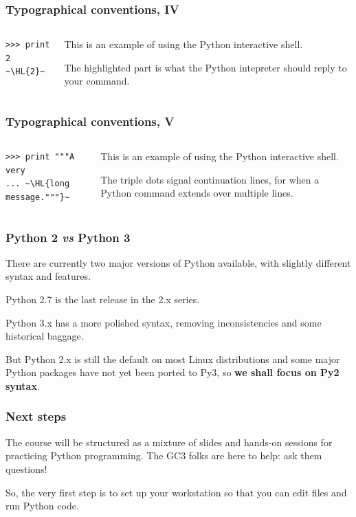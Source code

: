 \documentclass[english,serif,mathserif,xcolor=pdftex,dvipsnames,table]{beamer}
\begin{document}
\begin{frame}[fragile]
  \frametitle{Typographical conventions, IV}

    \begin{columns}[t]
    \begin{column}{0.5\textwidth}
\begin{lstlisting}
>>> print 2
~\HL{2}~
\end{lstlisting}
    \end{column}
    \begin{column}{0.5\textwidth}
      \raggedleft
      This is an example of using the Python interactive shell.

      \+
      The highlighted part is what the Python intepreter should
      reply to your command.
    \end{column}
  \end{columns}
\end{frame}


\begin{frame}[fragile]
  \frametitle{Typographical conventions, V}

    \begin{columns}[t]
    \begin{column}{0.5\textwidth}
\begin{lstlisting}
>>> print """A very
... ~\HL{long message."""}~
\end{lstlisting}
    \end{column}
    \begin{column}{0.5\textwidth}
      \raggedleft
      This is an example of using the Python interactive shell.

      \+
      The triple dots signal continuation lines,
      for when a Python command extends over multiple lines.
    \end{column}
  \end{columns}
\end{frame}


\begin{frame}
  \frametitle{Python 2 \emph{vs} Python 3}

  There are currently two major versions of Python available, with
  slightly different syntax and features.

  \+
  Python 2.7 is the last release in the 2.x series.

  \+
  Python 3.x has a more polished syntax, removing inconsistencies and
  some historical baggage.

  \+
  But Python 2.x is still the default on most Linux distributions
  and some major Python packages have not yet been ported to Py3, so
  \textbf{we shall focus on Py2 syntax}.
\end{frame}


\begin{frame}
  \frametitle{Next steps}

  The course will be structured as a mixture of slides and hands-on
  sessions for practicing Python programming.  The GC3 folks are here
  to help: ask them questions!

  \+
  So, the very first step is to set up your workstation so that you
  can edit files and run Python code.
\end{frame}
\end{document}
